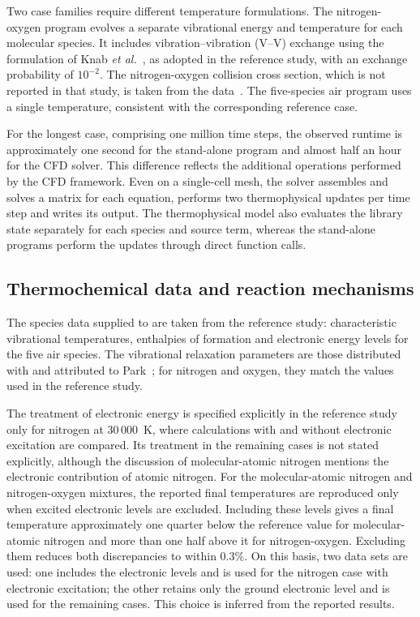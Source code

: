 Two case families require different temperature formulations. The
nitrogen-oxygen program evolves a separate vibrational energy and temperature
for each molecular species. It includes vibration--vibration (V--V) exchange
using the formulation of Knab \textit{et al.}~\cite{knab1995}, as adopted in
the reference study, with an exchange probability of $10^{-2}$. The
nitrogen-oxygen collision cross section, which is not reported in that study,
is taken from the \hyfoam{} data~\cite{hystrath}. The five-species air program
uses a single temperature, consistent with the corresponding reference case.

For the longest case, comprising one million time steps, the observed runtime
is approximately one second for the stand-alone program and almost half an
hour for the CFD solver. This difference reflects the additional operations
performed by the CFD framework. Even on a single-cell mesh, the solver
assembles and solves a matrix for each equation, performs two thermophysical
updates per time step and writes its output. The thermophysical model also
evaluates the library state separately for each species and source term,
whereas the stand-alone programs perform the updates through direct function
calls.

\subsection{Thermochemical data and reaction mechanisms}
\label{sec:dati}

The species data supplied to \mpp{} are taken from the reference study:
characteristic vibrational temperatures, enthalpies of formation and
electronic energy levels for the five air species. The vibrational relaxation
parameters are those distributed with \mpp{} and attributed to
Park~\cite{park1993}; for nitrogen and oxygen, they match the values used in
the reference study.

The treatment of electronic energy is specified explicitly in the reference
study only for nitrogen at 30\,000~K, where calculations with and without
electronic excitation are compared. Its treatment in the remaining cases is
not stated explicitly, although the discussion of molecular-atomic nitrogen
mentions the electronic contribution of atomic nitrogen. For the
molecular-atomic nitrogen and nitrogen-oxygen mixtures, the reported final
temperatures are reproduced only when excited electronic levels are excluded.
Including these levels gives a final temperature approximately one quarter
below the reference value for molecular-atomic nitrogen and more than one
half above it for nitrogen-oxygen. Excluding them reduces both discrepancies
to within 0.3\%. On this basis, two data sets are used: one includes the
electronic levels and is used for the nitrogen case with electronic
excitation; the other retains only the ground electronic level and is used
for the remaining cases. This choice is inferred from the reported results.

